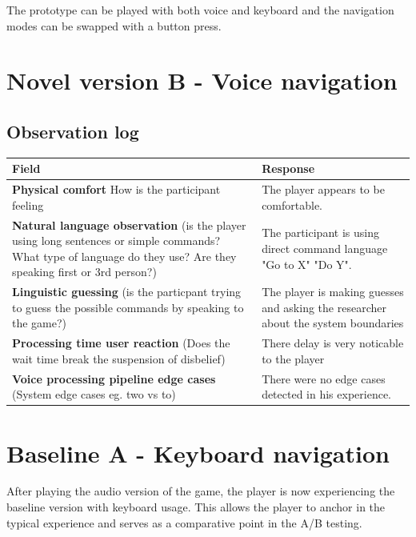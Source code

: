 The prototype can be played with both voice and keyboard and the navigation modes can be swapped with a button press. 


\section{Novel version B - Voice navigation}

\subsection{Observation log}
\begin{table}[H]
\centering
\begin{tabular}{|p{5cm}|p{10cm}|}
\hline
\textbf{Field} & \textbf{Response} \\ \hline
\textbf{Physical comfort} How is the participant feeling & The player appears to be comfortable.  \\[1.5cm] \hline
\textbf{Natural language observation} (is the player using long sentences or simple commands? What type of language do they use? Are they speaking first or 3rd person?) & The participant is using direct command language "Go to X" "Do Y". \\[1.5cm] \hline
\textbf{Linguistic guessing} (is the particpant trying to guess the possible commands by speaking to the game?) & The player is making guesses and asking the researcher about the system boundaries \\[1.5cm] \hline
\textbf{Processing time user reaction} (Does the wait time break the suspension of disbelief) & There delay is very noticable to the player \\[1.5cm] \hline
\textbf{Voice processing pipeline edge cases} (System edge cases eg. two vs to)& There were no edge cases detected in his experience. \\[1.5cm] \hline
\end{tabular}
\end{table}


\section{Baseline A - Keyboard navigation}
After playing the audio version of the game, the player is now experiencing the baseline version with keyboard usage.
This allows the player to anchor in the typical experience and serves as a comparative point in the A/B testing.

